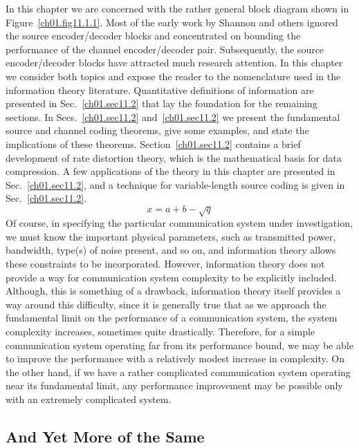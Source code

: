 In this chapter we are concerned with the rather general block diagram
shown in Figure~\ref{ch01.fig11.1.1}. Most of the early work by
Shannon and others ignored the source  encoder/decoder blocks and
concentrated  on bounding the performance of the channel
encoder/decoder pair. Subsequently, the source  encoder/decoder blocks
have attracted much research attention.  In this chapter we consider
both topics and expose the reader to the nomenclature used in the
information theory literature.
Quantitative definitions of information are presented in
Sec.~\ref{ch01.sec11.2} that lay the foundation for the remaining
sections. In Secs.~\ref{ch01.sec11.2} and~\ref{ch01.sec11.2} we present
the fundamental source and channel coding theorems, give some examples,
and state the implications of these theorems.
Section~\ref{ch01.sec11.2} contains a brief development of rate
distortion theory,
which is the mathematical basis for data compression.
A few applications of the theory in this chapter are presented
in Sec.~\ref{ch01.sec11.2}, and a technique for variable-length
source coding is given in Sec.~\ref{ch01.sec11.2}.
\begin{equation}
x = a + b - \sqrt{q}
\end{equation}
Of course, in specifying the particular communication system under
investigation, we must know the important physical parameters,
such as transmitted
power, bandwidth, type(s) of noise present, and so on,
and information theory allows these constraints to be incorporated.
However, information theory does not provide a way for communication system
complexity to be explicitly included.
Although, this is something of a drawback, information theory itself provides
a way around this difficulty, since it is generally true that as we approach
the fundamental limit on the performance of a communication system,
the system complexity increases, sometimes quite drastically.
Therefore, for a simple communication system operating far
from its performance bound, we may be able to improve the performance
with a relatively modest increase in complexity.
On the other hand, if we have a rather complicated communication system
operating near its fundamental limit, any performance improvement may
be possible only with an extremely complicated system.

\subsection{And Yet More of the Same}

